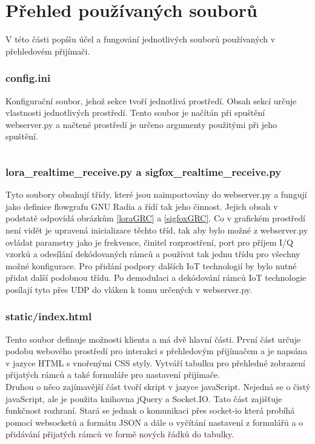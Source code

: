 \documentclass{ctuthesis}
\begin{document}
\section{Přehled používaných souborů}
V této části popíšu účel a fungování jednotlivých souborů používaných v přehledovém přijímači.

\subsubsection{config.ini}
Konfigurační soubor, jehož sekce tvoří jednotlivá prostředí. Obsah sekcí určuje vlastnosti jednotlivých prostředí. Tento soubor je načítán při spuštění webserver.py a načtené prostředí je určeno argumenty použitými při jeho spuštění.
\begin{lstlisting}

\end{lstlisting}
\subsubsection{lora\_realtime\_receive.py a sigfox\_realtime\_receive.py}
Tyto soubory obsahují třídy, které jsou naimportovány do webserver.py a fungují jako definice flowgrafu GNU Radia a řídí tak jeho činnost. Jejich obsah v podstatě odpovídá obrázkům \ref{loraGRC} a \ref{sigfoxGRC}. Co v grafickém prostředí není vidět je upravená inicializace těchto tříd, tak aby bylo možné z webserver.py ovládat parametry jako je frekvence, činitel rozprostření, port pro příjem I/Q vzorků a odesílání dekódovaných rámců a používat tak jednu třídu pro všechny možné konfigurace. Pro přidání podpory dalších IoT technologií by bylo nutné přidat další podobnou třídu. Po demodulaci a dekódování rámců IoT technologie posílají tyto přes UDP do vláken k tomu určených v webserver.py.
\subsubsection{static/index.html}
Tento soubor definuje možnosti klienta a má dvě hlavní části. První část určuje podobu webového prostředí pro interakci s přehledovým přijímačem a je napsána v jazyce HTML s vnořenými CSS styly. Vytváří tabulku pro přehledné zobrazení přijatých rámců a také formuláře pro nastavení přijímače.\\
Druhou o něco zajímavější část tvoří skript v jazyce javaScript. Nejedná se o čistý javaScript, ale je použita knihovna jQuery a Socket.IO. Tato část zajišťuje funkčnost rozhraní. Stará se jednak o komunikaci přes socket-io která probíhá pomocí websocketů a formátu JSON a dále o vyčítání nastavení z formulářů a o přidávání přijatých rámců ve formě nových řádků do tabulky.
\end{document}

